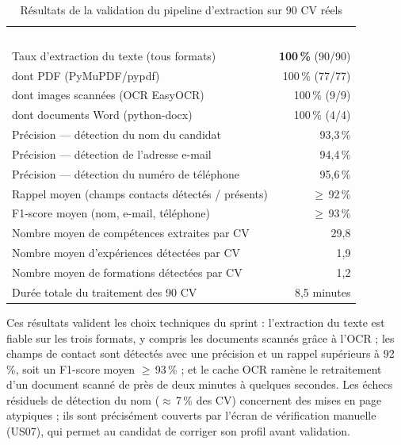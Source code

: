 \documentclass[12pt,a4paper]{report}
\begin{document}
\begin{table}[H]
\centering
\caption{Résultats de la validation du pipeline d'extraction sur 90 CV réels}
\label{tab:metriques-s2}
\small
\begin{tabularx}{\textwidth}{X r}
\rowcolor{tabheader}
\textcolor{white}{\textbf{Indicateur}} & \textcolor{white}{\textbf{Résultat}} \\
Taux d'extraction du texte (tous formats) & \textbf{100\,\%} (90/90) \\
\rowcolor{tabalt}
\quad dont PDF (PyMuPDF/pypdf) & 100\,\% (77/77) \\
\quad dont images scannées (OCR EasyOCR) & 100\,\% (9/9) \\
\rowcolor{tabalt}
\quad dont documents Word (python-docx) & 100\,\% (4/4) \\
Précision — détection du nom du candidat & 93,3\,\% \\
\rowcolor{tabalt}
Précision — détection de l'adresse e-mail & 94,4\,\% \\
Précision — détection du numéro de téléphone & 95,6\,\% \\
\rowcolor{tabalt}
Rappel moyen (champs contacts détectés / présents) & $\geq$\,92\,\% \\
F1-score moyen (nom, e-mail, téléphone) & $\geq$\,93\,\% \\
\rowcolor{tabalt}
Nombre moyen de compétences extraites par CV & 29,8 \\
Nombre moyen d'expériences détectées par CV & 1,9 \\
\rowcolor{tabalt}
Nombre moyen de formations détectées par CV & 1,2 \\
Durée totale du traitement des 90 CV & 8,5 minutes \\
\bottomrule
\end{tabularx}
\end{table}

Ces résultats valident les choix techniques du sprint : l'extraction du texte est fiable sur les trois formats, y compris les documents scannés grâce à l'OCR ; les champs de contact sont détectés avec une précision et un rappel supérieurs à 92\,\%, soit un F1-score moyen $\geq$\,93\,\% ; et le cache OCR ramène le retraitement d'un document scanné de près de deux minutes à quelques secondes. Les échecs résiduels de détection du nom ($\approx$\,7\,\% des CV) concernent des mises en page atypiques ; ils sont précisément couverts par l'écran de vérification manuelle (US07), qui permet au candidat de corriger son profil avant validation.
\end{document}
